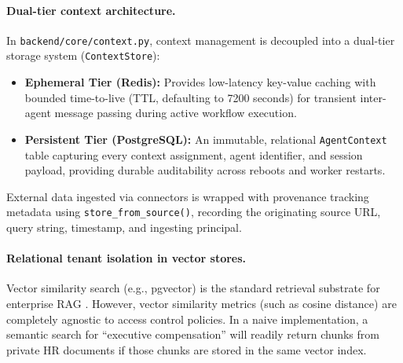 \documentclass[10pt,a4paper,twocolumn]{article}
\begin{document}
\paragraph{Dual-tier context architecture.} In \texttt{backend/core/context.py}, context management is decoupled into a dual-tier storage system (\texttt{ContextStore}):
\begin{itemize}[leftmargin=*]
  \item \textbf{Ephemeral Tier (Redis):} Provides low-latency key-value caching with bounded time-to-live (TTL, defaulting to 7200 seconds) for transient inter-agent message passing during active workflow execution.
  \item \textbf{Persistent Tier (PostgreSQL):} An immutable, relational \texttt{AgentContext} table capturing every context assignment, agent identifier, and session payload, providing durable auditability across reboots and worker restarts.
\end{itemize}
External data ingested via connectors is wrapped with provenance tracking metadata using \texttt{store\_from\_source()}, recording the originating source URL, query string, timestamp, and ingesting principal.

\paragraph{Relational tenant isolation in vector stores.} Vector similarity search (e.g., pgvector) is the standard retrieval substrate for enterprise RAG \cite{lewis2020rag}. However, vector similarity metrics (such as cosine distance) are completely agnostic to access control policies. In a naive implementation, a semantic search for ``executive compensation'' will readily return chunks from private HR documents if those chunks are stored in the same vector index.
\end{document}
